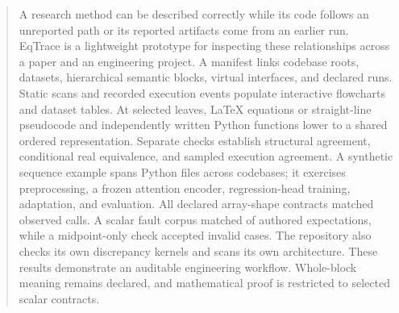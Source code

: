 \begin{abstract}
A research method can be described correctly while its code follows an unreported path or its reported artifacts come from an earlier run. EqTrace is a lightweight prototype for inspecting these relationships across a paper and an engineering project. A manifest links codebase roots, datasets, hierarchical semantic blocks, virtual interfaces, and declared runs. Static scans and recorded execution events populate interactive flowcharts and dataset tables. At selected leaves, LaTeX equations or straight-line pseudocode and independently written Python functions lower to a shared ordered representation. Separate checks establish structural agreement, conditional real equivalence, and sampled execution agreement. A synthetic sequence example spans \EngineeringFiles{} Python files across \EngineeringCodebases{} codebases; it exercises preprocessing, a frozen attention encoder, regression-head training, adaptation, and evaluation. All \ShapeContracts{} declared array-shape contracts matched observed calls. A scalar fault corpus matched \ExpectedMatches{} of \CorpusCases{} authored expectations, while a midpoint-only check accepted \MidpointFalsePasses{} invalid cases. The repository also checks its own discrepancy kernels and scans its own architecture. These results demonstrate an auditable engineering workflow. Whole-block meaning remains declared, and mathematical proof is restricted to selected scalar contracts.
\end{abstract}
